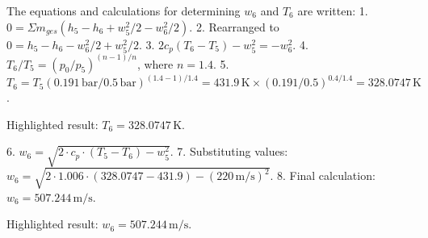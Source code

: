 The equations and calculations for determining \( w_6 \) and \( T_6 \) are written:  
1. \( 0 = \Sigma m_{ges} (h_5 - h_6 + w_5^2 / 2 - w_6^2 / 2) \).  
2. Rearranged to \( 0 = h_5 - h_6 - w_6^2 / 2 + w_5^2 / 2 \).  
3. \( 2 c_{p} (T_6 - T_5) - w_5^2 = -w_6^2 \).  
4. \( T_6 / T_5 = (p_0 / p_5)^{(n - 1) / n} \), where \( n = 1.4 \).  
5. \( T_6 = T_5 (0.191 \, \text{bar} / 0.5 \, \text{bar})^{(1.4 - 1) / 1.4} = 431.9 \, \text{K} \times (0.191 / 0.5)^{0.4 / 1.4} = 328.0747 \, \text{K} \).  

Highlighted result: \( T_6 = 328.0747 \, \text{K} \).  

6. \( w_6 = \sqrt{2 \cdot c_{p} \cdot (T_5 - T_6) - w_5^2} \).  
7. Substituting values: \( w_6 = \sqrt{2 \cdot 1.006 \cdot (328.0747 - 431.9) - (220 \, \text{m/s})^2} \).  
8. Final calculation: \( w_6 = 507.244 \, \text{m/s} \).  

Highlighted result: \( w_6 = 507.244 \, \text{m/s} \).